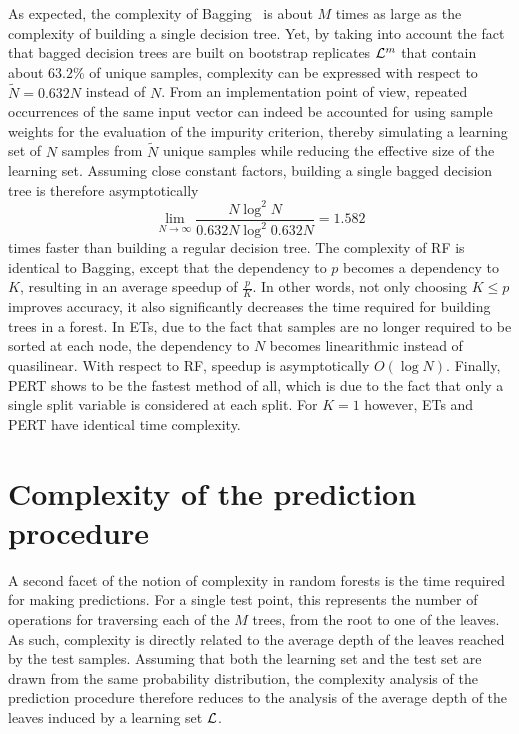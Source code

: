As expected, the complexity of Bagging~\citep{breiman:1996b} is about $M$ times
as large as the complexity of building a single decision tree. Yet, by taking
into account the fact that bagged decision trees are built on bootstrap
replicates ${\cal L}^m$ that contain about $63.2\%$ of unique samples,
complexity can be expressed with respect to $\widetilde{N} = 0.632 N$ instead
of $N$. From an implementation point of view, repeated occurrences of the same
input vector can indeed be accounted for using sample weights for the
evaluation of the impurity criterion, thereby  simulating a learning set of $N$
samples from $\widetilde{N}$ unique samples while reducing the effective size
of the learning set. Assuming close constant factors, building a single bagged
decision tree is therefore asymptotically
\begin{equation}
\lim_{N\to \infty} \frac{N\log^2 N}{0.632N \log^2 0.632N} = 1.582
\end{equation}
times faster than building a regular decision tree. The complexity of RF is
identical to Bagging, except that the dependency
to $p$ becomes a dependency to $K$, resulting in an average speedup of
$\tfrac{p}{K}$. In other words, not only choosing $K \leq p$ improves accuracy,
it also significantly decreases the time required for building trees in a
forest. In ETs, due to the fact that
samples are no longer required to be sorted at each node, the dependency to $N$
becomes linearithmic instead of quasilinear. With respect to RF,
speedup is asymptotically $O(\log N)$. Finally, PERT shows to be the fastest
method of all, which is due to the fact that only a single split variable
is considered at each split. For $K=1$ however, ETs and PERT have identical
time complexity.

\section{Complexity of the prediction procedure}
\label{sec:5:complexity-predict}

A second facet of the notion of complexity in random forests is the time
required for making predictions. For a single test point, this represents the
number of operations for traversing each of the $M$ trees, from the root to one
of the leaves. As such, complexity is directly related to the average depth of
the leaves reached by the test samples. Assuming that both the learning set and
the test set are drawn from the same probability distribution, the complexity
analysis of the prediction procedure therefore reduces to the analysis of the
average depth of the leaves induced by a learning set ${\cal L}$.

